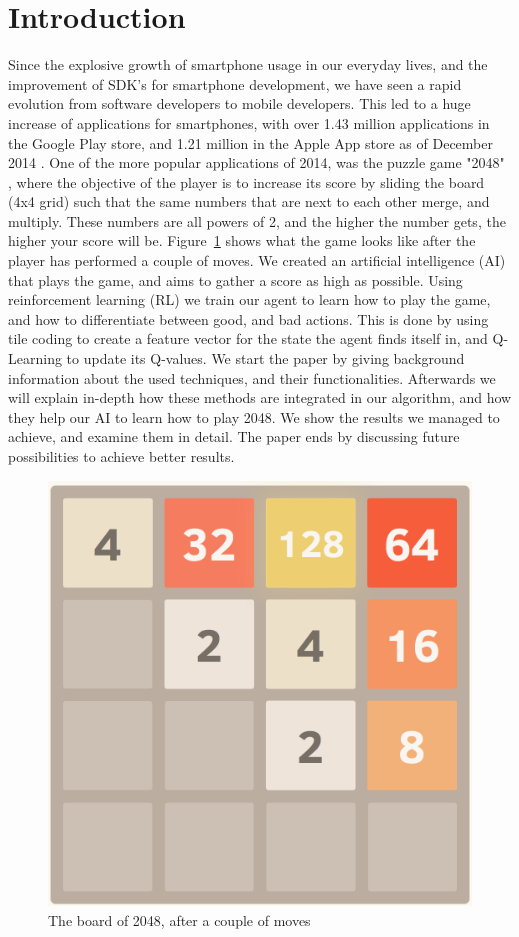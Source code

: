 \documentclass[a4paper,12pt]{article}
\begin{document}
\section{Introduction}
Since the explosive growth of smartphone usage in our everyday lives, and the improvement of SDK's for smartphone development, we have seen a rapid evolution from software developers to mobile developers. This led to a huge increase of applications for smartphones, with over 1.43 million applications in the Google Play store, and 1.21 million in the Apple App store as of December 2014 \cite{appstores}. One of the more popular applications of 2014, was the puzzle game "2048" \cite{2048}, where the objective of the player is to increase its score by sliding the board (4x4 grid) such that the same numbers that are next to each other merge, and multiply. These numbers are all powers of 2, and the higher the number gets, the higher your score will be. Figure~\ref{fig:2048} shows what the game looks like after the player has performed a couple of moves. We created an artificial intelligence (AI) that plays the game, and aims to gather a score as high as possible. Using reinforcement learning (RL) \cite{sutton1998rl} we train our agent to learn how to play the game, and how to differentiate between good, and bad actions. This is done by using tile coding \cite{sutton1998rl} to create a feature vector for the state the agent finds itself in, and Q-Learning \cite{sutton1998rl} to update its Q-values. We start the paper by giving background information about the used techniques, and their functionalities. Afterwards we will explain in-depth how these methods are integrated in our algorithm, and how they help our AI to learn how to play 2048. We show the results we managed to achieve, and examine them in detail. The paper ends by discussing future possibilities to achieve better results.
\begin{figure}[t]
\centering
\includegraphics[scale=0.35]{img/2048board}
\caption{The board of 2048, after a couple of moves}
\label{fig:2048}
\end{figure}
\end{document}
